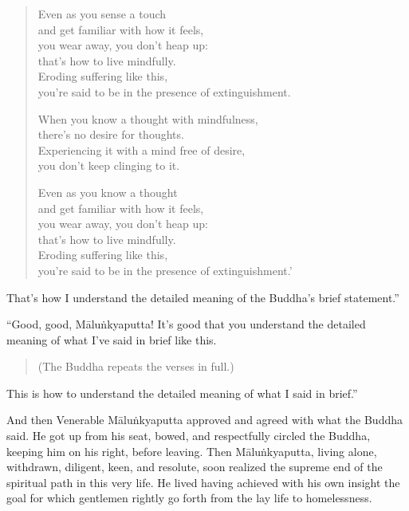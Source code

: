 \documentclass[12pt,openany]{book}%
\begin{document}
\begin{verse}
Even as you sense a touch \\
and get familiar with how it feels, \\
you wear away, you don’t heap up: \\
that’s how to live mindfully. \\
Eroding suffering like this, \\
you’re said to be in the presence of extinguishment. 

When you know a thought with mindfulness, \\
there’s no desire for thoughts. \\
Experiencing it with a mind free of desire, \\
you don’t keep clinging to it. 

Even as you know a thought \\
and get familiar with how it feels, \\
you wear away, you don’t heap up: \\
that’s how to live mindfully. \\
Eroding suffering like this, \\
you’re said to be in the presence of extinguishment.’ 

%
\end{verse}

That’s how I understand the detailed meaning of the Buddha’s brief statement.” 

“Good, good, \textsanskrit{Māluṅkyaputta}! It’s good that you understand the detailed meaning of what I’ve said in brief like this. 

\begin{verse}%
(The Buddha repeats the verses in full.) 

%
\end{verse}

This is how to understand the detailed meaning of what I said in brief.” 

And then Venerable \textsanskrit{Māluṅkyaputta} approved and agreed with what the Buddha said. He got up from his seat, bowed, and respectfully circled the Buddha, keeping him on his right, before leaving. Then \textsanskrit{Māluṅkyaputta}, living alone, withdrawn, diligent, keen, and resolute, soon realized the supreme end of the spiritual path in this very life. He lived having achieved with his own insight the goal for which gentlemen rightly go forth from the lay life to homelessness. 
\end{document}
